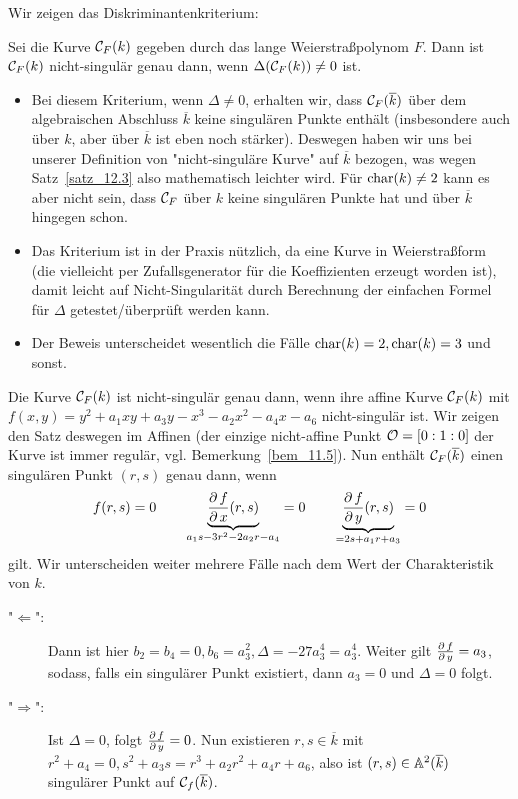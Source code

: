 Wir zeigen das Diskriminantenkriterium:
\begin{satz}[Diskriminantenkriterium]
\label{satz_12.3}
	Sei die Kurve $\mathcal{C}_F(k)$ gegeben durch das lange Weierstraßpolynom $F$. Dann ist $\mathcal{C}_F(k)$ nicht-singulär genau dann, wenn $\Delta(\mathcal{C}_F(k)) \neq 0$ ist.
\end{satz}

\begin{bem}
	\begin{itemize}
		\item Bei diesem Kriterium, wenn $\Delta \neq 0$, erhalten wir, dass $\mathcal{C}_F(\overline{k})$ über dem algebraischen Abschluss $\overline{k}$ keine singulären Punkte enthält (insbesondere auch über $k$, aber über $\overline{k}$ ist eben noch stärker). Deswegen haben wir uns bei unserer Definition von "nicht-singuläre Kurve" auf $\overline{k}$ bezogen, was wegen Satz~\ref{satz_12.3} also mathematisch leichter wird. Für $\operatorname{char}(k) \neq 2$ kann es aber nicht sein, dass $\mathcal{C}_F$ über $k$ keine singulären Punkte hat und über $\overline{k}$ hingegen schon.
		\item Das Kriterium ist in der Praxis nützlich, da eine Kurve in Weierstraßform (die vielleicht per Zufallsgenerator für die Koeffizienten erzeugt worden ist), damit leicht auf Nicht-Singularität durch Berechnung der einfachen Formel für $\Delta$ getestet/überprüft werden kann.
		\item Der Beweis unterscheidet wesentlich die Fälle $\operatorname{char}(k) = 2, \operatorname{char}(k) = 3$ und sonst.
	\end{itemize}
\end{bem}

\begin{bew}
	Die Kurve $\mathcal{C}_F(k)$ ist nicht-singulär genau dann, wenn ihre affine Kurve $\mathcal{C}_F(k)$ mit $f(x,y) = y^2 + a_1xy + a_3y - x^3 - a_2x^2 - a_4 x - a_6$ nicht-singulär ist. Wir zeigen den Satz deswegen im Affinen (der einzige nicht-affine Punkt $\mathcal{O} = [0:1:0]$ der Kurve ist immer regulär, vgl. Bemerkung~\ref{bem_11.5}). Nun enthält $\mathcal{C}_F(\overline{k})$ einen singulären Punkt $(r,s)$ genau dann, wenn
	\[ f(r,s) = 0 \qquad \underbrace{\frac{\operatorname{\partial} f}{\operatorname{\partial} x} (r,s)}_{a_1 s - 3r^2 - 2a_2r - a_4} = 0 \qquad \underbrace{\frac{\operatorname{\partial} f}{\operatorname{\partial} y} (r,s)}_{=2s + a_1 r + a_3} = 0 \]
	gilt. Wir unterscheiden weiter mehrere Fälle nach dem Wert der Charakteristik von $k$.
\end{bew}

\begin{bew}[1. Fall: $\Char(k)= 2$ und $a_1 = 0$]
	\begin{description}
		\item["$\Leftarrow$":] Dann ist hier $b_2 = b_4 = 0, b_6 = a_3^2, \Delta = -27a_3^4 = a_3^4$. Weiter gilt $\frac{\operatorname{\partial} f}{\operatorname{\partial} y} = a_3$, sodass, falls ein singulärer Punkt existiert, dann $a_3 = 0$ und $\Delta = 0$ folgt.
		\item["$\Rightarrow$":] Ist $\Delta = 0$, folgt $\frac{\operatorname{\partial} f}{\operatorname{\partial} y} = 0$. Nun existieren $r,s \in \overline{k}$ mit $r^2 + a_4=0, s^2 + a_3s = r^3 + a_2r^2 + a_4r + a_6$, also ist $(r,s) \in \mathbb{A}^2(\overline{k})$ singulärer Punkt auf $\mathcal{C}_f(\overline{k})$.
	\end{description}
\end{bew}

